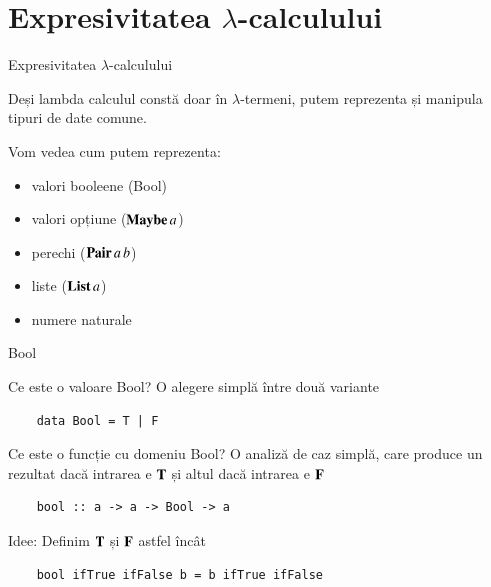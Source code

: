 \documentclass[xcolor=pdftex,romanian,colorlinks]{beamer}
\begin{document}
\section{\color{section-color} Expresivitatea $\lambda$-calculului}

\begin{frame}{Expresivitatea $\lambda$-calculului}

Deși lambda calculul constă doar în $\lambda$-termeni, putem reprezenta și manipula tipuri de date comune.

Vom vedea cum putem reprezenta:
\begin{itemize}
	\item valori booleene (Bool)
	\item valori opțiune ($\mathop{\mathbf{Maybe}}{a}$) 
	\item perechi ($\mathop{\mathop{\mathbf{Pair}}{a}}{b}$)
	\item liste ($\mathop{\mathbf{List}}{a}$)
	\item numere naturale
\end{itemize}
\end{frame}

\begin{frame}[fragile]{Bool}

\begin{block}{Ce este o valoare Bool?}
		O alegere simplă între două variante
	\begin{lstlisting}
	data Bool = T | F
	\end{lstlisting}
\end{block}

\begin{block}{Ce este o funcție cu domeniu Bool?}
		O analiză de caz simplă, care produce un rezultat dacă intrarea e $\mathbf{T}$ și altul dacă intrarea e $\mathbf{F}$
	\begin{lstlisting}
	bool :: a -> a -> Bool -> a
	\end{lstlisting}
\end{block}

\begin{block}{Idee:
	Definim $\mathbf{T}$ și $\mathbf{F}$ astfel încât}
	\begin{lstlisting}
	bool ifTrue ifFalse b = b ifTrue ifFalse
	\end{lstlisting}
\end{block}

\end{frame}
\end{document}
